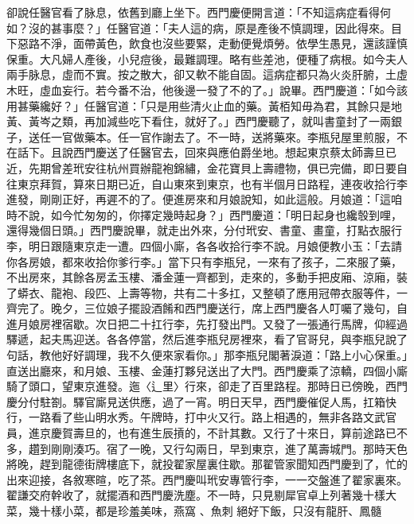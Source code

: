 \begin{showcontents}{}
卻說任醫官看了脉息，依舊到廳上坐下。西門慶便開言道：「不知這病症看得何如？沒的甚事麼？」任醫官道：「夫人這的病，原是產後不慎調理，因此得來。目下惡路不淨，面帶黃色，飲食也沒些要緊，走動便覺煩勞。依學生愚見，還該謹慎保重。大凡婦人產後，小兒痘後，最難調理。略有些差池，便種了病根。如今夫人兩手脉息，虛而不實。按之散大，卻又軟不能自固。這病症都只為火炎肝腑，土虛木旺，虛血妄行。若今番不治，他後邊一發了不的了。」說畢。西門慶道：「如今該用甚藥纔好？」任醫官道：「只是用些清火止血的藥。黃栢知毋為君，其餘只是地黃、黃岑之類，再加減些吃下看住，就好了。」西門慶聽了，就叫書童封了一兩銀子，送任一官做藥本。任一官作謝去了。不一時，送將藥來。李瓶兒屋里煎服，不在話下。且說西門慶送了任醫官去，回來與應伯爵坐地。想起東京蔡太師壽旦已近，先期曾差玳安往杭州買辦龍袍錦繡，金花寶貝上壽禮物，俱已完備，即日要自往東京拜賀，算來日期已近，自山東來到東京，也有半個月日路程，連夜收拾行李進發，剛剛正好，再遲不的了。便進房來和月娘說知，如此這般。月娘道：「這咱時不說，如今忙匆匆的，你擇定幾時起身？」西門慶道：「明日起身也纔彀到哩，還得幾個日頭。」西門慶說畢，就走出外來，分付玳安、書童、畫童，打點衣服行李，明日跟隨東京走一遭。四個小廝，各各收拾行李不說。月娘便教小玉：「去請你各房娘，都來收拾你爹行李。」當下只有李瓶兒，一來有了孩子，二來服了藥，不出房來，其餘各房孟玉樓、潘金蓮一齊都到，走來的，多動手把皮廂、涼廂，裝了蟒衣、龍袍、段匹、上壽等物，共有二十多扛，又整頓了應用冠帶衣服等件，一齊完了。晚夕，三位娘子擺設酒餚和西門慶送行，席上西門慶各人叮囑了幾句，自進月娘房裡宿歇。次日把二十扛行李，先打發出門。又發了一張通行馬牌，仰經過驛遞，起夫馬迎送。各各停當，然后進李瓶兒房裡來，看了官哥兒，與李瓶兒說了句話，教他好好調理，我不久便來家看你。」那李瓶兒閣著淚道：「路上小心保重。」直送出廳來，和月娘、玉樓、金蓮打夥兒送出了大門。西門慶乘了涼轎，四個小廝騎了頭口，望東京進發。迤〈辶里〉行來，卻走了百里路程。那時日已傍晚，西門慶分付駐劄。驛官廝見送供應，過了一宵。明日天早，西門慶催促人馬，扛箱快行，一路看了些山明水秀。午牌時，打中火又行。路上相遇的，無非各路文武官員，進京慶賀壽旦的，也有進生辰摃的，不計其數。又行了十來日，算前途路已不多，趲到剛剛湊巧。宿了一晚，又行勾兩日，早到東京，進了萬壽城門。那時天色將晚，趕到龍德街牌樓底下，就投翟家屋裏住歇。那翟管家聞知西門慶到了，忙的出來迎接，各敘寒暄，吃了茶。西門慶叫玳安專管行李，一一交盤進了翟家裏來。翟謙交府幹收了，就擺酒和西門慶洗塵。不一時，只見剔犀官卓上列著幾十樣大菜，幾十樣小菜，都是珍羞美味，燕窩 、魚刺 絕好下飯，只沒有龍肝、鳳髓 
\end{showcontents}
